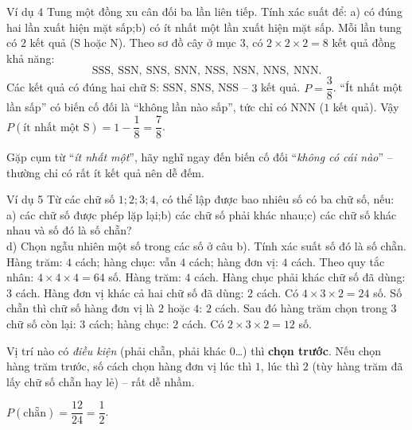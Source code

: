 \begin{exbox}{Ví dụ 4}
Tung một đồng xu cân đối ba lần liên tiếp. Tính xác suất để:
a) có đúng hai lần xuất hiện mặt sấp;\quad b) có ít nhất một lần xuất hiện mặt sấp.
\guide
{}
Mỗi lần tung có $2$ kết quả (S hoặc N). Theo sơ đồ cây ở mục 3, có $2\times2\times2=8$ kết quả đồng khả năng:
\[
\text{SSS},\ \text{SSN},\ \text{SNS},\ \text{SNN},\ \text{NSS},\ \text{NSN},\ \text{NNS},\ \text{NNN}.
\]
Các kết quả có đúng hai chữ S: SSN, SNS, NSS -- $3$ kết quả. $P=\dfrac38$.
``Ít nhất một lần sấp'' có biến cố đối là ``không lần nào sấp'', tức chỉ có NNN ($1$ kết quả). Vậy
$P(\text{ít nhất một S})=1-\dfrac18=\dfrac78$.
\begin{tipbox}Gặp cụm từ ``\emph{ít nhất một}'', hãy nghĩ ngay đến biến cố đối ``\emph{không có cái nào}'' -- thường chỉ có rất ít kết quả nên dễ đếm.\end{tipbox}
\end{exbox}

\begin{exbox}{Ví dụ 5}
Từ các chữ số $1;2;3;4$, có thể lập được bao nhiêu số có ba chữ số, nếu:
a) các chữ số được phép lặp lại;\quad b) các chữ số phải khác nhau;\quad c) các chữ số khác nhau và số đó là số chẵn?\\
d) Chọn ngẫu nhiên một số trong các số ở câu b). Tính xác suất số đó là số chẵn.
\guide
{}
Hàng trăm: $4$ cách; hàng chục: vẫn $4$ cách; hàng đơn vị: $4$ cách. Theo quy tắc nhân: $4\times4\times4=64$ số.
Hàng trăm: $4$ cách. Hàng chục phải khác chữ số đã dùng: $3$ cách. Hàng đơn vị khác cả hai chữ số đã dùng: $2$ cách. Có $4\times3\times2=24$ số.
Số chẵn thì chữ số hàng đơn vị là $2$ hoặc $4$: $2$ cách. Sau đó hàng trăm chọn trong $3$ chữ số còn lại: $3$ cách; hàng chục: $2$ cách. Có $2\times3\times2=12$ số.
\begin{tipbox}Vị trí nào có \emph{điều kiện} (phải chẵn, phải khác $0$\ldots) thì \textbf{chọn trước}. Nếu chọn hàng trăm trước, số cách chọn hàng đơn vị lúc thì $1$, lúc thì $2$ (tùy hàng trăm đã lấy chữ số chẵn hay lẻ) -- rất dễ nhầm.\end{tipbox}
$P(\text{chẵn})=\dfrac{12}{24}=\dfrac12$.
\end{exbox}

